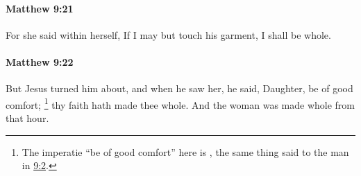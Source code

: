		\paragraph{Matthew 9:21} %
			\label{MATTHEW-9-21}

			For she said within herself, If I may but touch his garment, I shall be whole.

			\begin{framed}
			\scriptsize
				\begin{compactdesc}
					\item[SBLG] 
				\end{compactdesc}
			\end{framed}

		\paragraph{Matthew 9:22} %
			\label{MATTHEW-9-22}

			But Jesus turned him about, and when he saw her, he said, Daughter, be of good comfort;%
				\footnote{%
					The imperatie ``be of good comfort'' here is , the same thing said to the man in \hyperref[MATTHEW-9-2]{9:2}.
					}
			thy faith hath made thee whole. And the woman was made whole from that hour.

